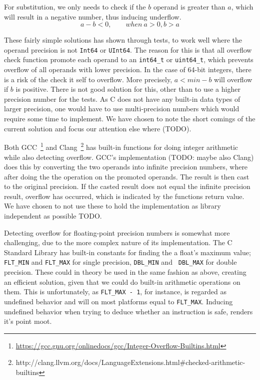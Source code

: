 For substitution, we only needs to check if the $b$ operand is greater
than $a$, which will result in a negative number, thus inducing underflow.
\begin{equation}
  a - b < 0, \qquad when\ a > 0, b > a
\end{equation}

These fairly simple solutions has shown through tests, to work well where the
operand precision is not {\tt Int64} or {\tt UInt64}. The reason for this is
that all overflow check function promote each operand to an {\tt int64\_t} or
{\tt uint64\_t}, which prevents overflow of all operands with lower
precision. In the case of 64-bit integers, there is a risk of the check it self
to overflow. More precisely, $a < min - b$ will overflow if $b$ is
positive. There is not good solution for this, other than to use a higher
precision number for the tests. As C does not have any built-in data types of
larger precision, one would have to use multi-precision numbers which would
require some time to implement. We have chosen to note the short comings of the
current solution and focus our attention else where (TODO).

Both
GCC~\footnote{\url{https://gcc.gnu.org/onlinedocs/gcc/Integer-Overflow-Builtins.html}}
and
Clang~\footnote{http://clang.llvm.org/docs/LanguageExtensions.html\#checked-arithmetic-builtins}
has built-in functions for doing integer arithmetic while also detecting
overflow. GCC's implementation (TODO: maybe also Clang) does this by converting
the two operands into infinite precision numbers, where after doing the the
operation on the promoted operands. The result is then cast to the original
precision. If the casted result does not equal the infinite precision result,
overflow has occurred, which is indicated by the functions return value. We have
chosen to not use these to hold the implementation as library independent as
possible TODO.

Detecting overflow for floating-point precision numbers is somewhat more
challenging, due to the more complex nature of its implementation. The C
Standard Library has built-in constants for finding the a float's maximum value;
{\tt FLT\_MIN} and {\tt FLT\_MAX} for single precision, {\tt DBL\_MIN} and {\tt
  DBL\_MAX} for double precision. These could in theory be used in the same
fashion as above, creating an efficient solution, given that we could do
built-in arithmetic operations on them. This is unfortunately, as {\tt FLT\_MAX
  - 1}, for instance, is regarded as undefined behavior and will on most
platforms equal to {\tt FLT\_MAX}. Inducing undefined behavior when trying to
deduce whether an instruction is safe, renders it's point moot.

